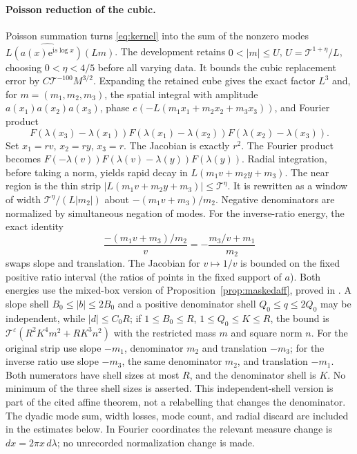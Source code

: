 \documentclass[11pt,a4paper,oneside]{article}
\theoremstyle{definition}
\newcommand{\eps}{\varepsilon}
\newcommand{\ii}{\mathrm i}
\newcommand{\e}{\mathrm e}
\newcommand{\Hhat}{\widehat}
\numberwithin{equation}{section}
\begin{document}
\paragraph{Poisson reduction of the cubic.}
Poisson summation turns \eqref{eq:kernel} into the sum of the nonzero modes
$L\Hhat{(a(x)\e^{\ii s\log x})}(Lm)$. The development retains
$0<|m|\le U$, $U=\mathcal T^{1+\eta}/L$, choosing $0<\eta<4/5$ before
all varying data. It bounds the cubic replacement error by
$C\mathcal T^{-100}M^{3/2}$. Expanding the retained cube gives the exact
factor $L^3$ and, for $m=(m_1,m_2,m_3)$, the spatial integral with amplitude
$a(x_1)a(x_2)a(x_3)$, phase $e(-L(m_1x_1+m_2x_2+m_3x_3))$, and Fourier product
\[
 F(\lambda(x_3)-\lambda(x_1))
 F(\lambda(x_1)-\lambda(x_2))
 F(\lambda(x_2)-\lambda(x_3)).
\]
Set $x_1=rv$, $x_2=ry$, $x_3=r$. The Jacobian is exactly $r^2$.
The Fourier product becomes
$F(-\lambda(v))F(\lambda(v)-\lambda(y))F(\lambda(y))$.
Radial integration, before taking a norm, yields rapid decay in
$L(m_1v+m_2y+m_3)$. The near region is the thin strip
$|L(m_1v+m_2y+m_3)|\le\mathcal T^\eta$.
It is rewritten as a window of width
$\mathcal T^\eta/(L|m_2|)$ about
$-(m_1v+m_3)/m_2$. Negative denominators are normalized by simultaneous
negation of modes. For the inverse-ratio energy, the exact identity
\[
 \frac{-(m_1v+m_3)/m_2}{v}
 =-\frac{m_3/v+m_1}{m_2}
\]
swaps slope and translation. The Jacobian for $v\mapsto1/v$ is bounded on
the fixed positive ratio interval (the ratios of points in the fixed support of $a$). Both energies use the mixed-box version of Proposition~\ref{prop:maskedaff}, proved in \cite{Lewko}. A slope shell $B_0\le|b|\le2B_0$ and a positive denominator shell $Q_0\le q\le2Q_0$ may be independent, while $|d|\le C_0R$; if $1\le B_0\le R$, $1\le Q_0\le K\le R$, the bound is $\mathcal T^\eps(R^2K^4m^2+RK^3n^2)$ with the restricted mass $m$ and square norm $n$. For the original strip use slope $-m_1$, denominator $m_2$ and translation $-m_3$; for the inverse ratio use slope $-m_3$, the same denominator $m_2$, and translation $-m_1$. Both numerators have shell sizes at most $R$, and the denominator shell is $K$. No minimum of the three shell sizes is asserted. This independent-shell version is part of the cited affine theorem, not a relabelling that changes the denominator. The dyadic mode sum,
width losses, mode count, and radial discard are included in the estimates below. In Fourier coordinates the relevant
measure change is $dx=2\pi x\,d\lambda$; no unrecorded normalization change
is made.
\end{document}
